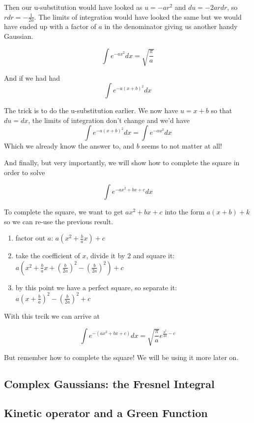 Then our u-substitution would have looked as $u = -ar^2$
and $du = -2ar dr$, so $r dr = -\frac{1}{2a}$.
The limits of integration would have looked the same but we would have ended up with a factor of $a$
in the denominator giving us another handy Gaussian.

$$
\int e^{-ax^2} dx = \sqrt{ \frac{\pi}{a} }
$$

And if we had had
$$
\int e^{-a\left(x + b\right)^2} dx
$$

The trick is to do the u-substitution earlier.
We now have $u = x+b$ so that $du = dx$, the limits of integration don't change and we'd have
$$
\int e^{-a\left(x + b\right)^2} dx
=
\int e^{-a u^2} dx
$$
Which we already know the answer to, and $b$ seems to not matter at all!

And finally, but very importantly, we will show how to complete the square in order to solve

$$
\int e^{-ax^2 + bx + c} dx
$$

To complete the square, we want to get $ax^2 + bx + c$ into the form $a(x+b) + k$ so we can
re-use the previous result.
\begin{enumerate}
\item factor out $a$: $a \left(x^2 + \frac{b}{a}x \right) + c$
\item take the coefficient of $x$, divide it by $2$ and square it: $a \left(x^2 + \frac{b}{a}x + \left(\frac{b}{2a}\right)^2 - \left(\frac{b}{2a}\right)^2 \right) + c$
\item by this point we have a perfect square, so separate it: $a \left(x + \frac{b}{a} \right)^2 - \left(\frac{b}{2a}\right)^2 + c$
\end{enumerate}

With this trcik we can arrive at

$$
\int e^{-\left(ax^2 + bx + c\right)} dx = \sqrt{\frac{\pi}{a}} e^{\frac{b^2}{4a} - c}
$$

But remember how to complete the square!
We will be using it more later on.


\subsection{Complex Gaussians: the Fresnel Integral}



\subsection{Kinetic operator and a Green Function} \label{integral:kinetic-operator}

